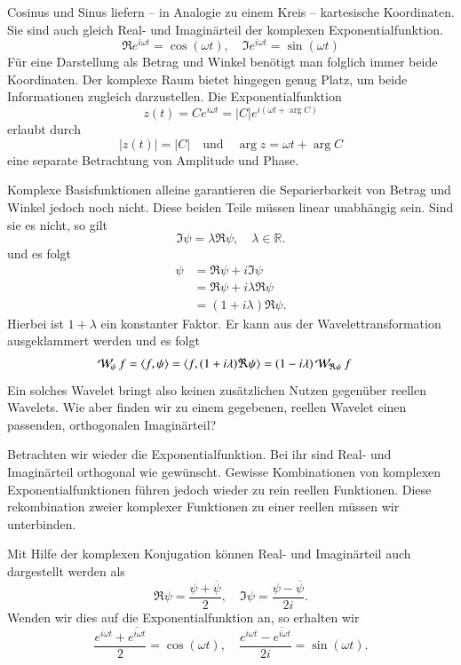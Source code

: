 Cosinus und Sinus liefern -- in Analogie zu einem Kreis -- kartesische Koordinaten. 
Sie sind auch gleich Real- und Imaginärteil der komplexen Exponentialfunktion.
\[
\Re e^{i\omega t} = \cos(\omega t), \quad \Im e^{i\omega t} = \sin(\omega t)
\]
Für eine Darstellung als Betrag und Winkel benötigt man folglich immer beide Koordinaten.
Der komplexe Raum bietet hingegen genug Platz, um beide Informationen zugleich darzustellen.
Die Exponentialfunktion
\[
	z(t) = Ce^{i\omega t} = |C|e^{i(\omega t + \arg C)}
\]
erlaubt durch 
\[
	|z(t)| = |C| 
	\quad \text{und}\quad
	\arg z = \omega t + \arg C
\]
eine separate Betrachtung von Amplitude und Phase.


Komplexe Basisfunktionen alleine garantieren die Separierbarkeit von Betrag und Winkel jedoch noch nicht.
Diese beiden Teile müssen linear unabhängig sein.
Sind sie es nicht, so gilt
\[\Im \psi = \lambda \Re \psi, \quad \lambda \in \mathbb R.\]
und es folgt
\begin{align*}
	\psi &= \Re \psi + i \Im \psi\\
	&= \Re \psi + i\lambda \Re \psi\\
	&= (1+i\lambda) \Re \psi.
\end{align*}
Hierbei ist $1+\lambda$ ein konstanter Faktor. 
Er kann aus der Wavelettransformation ausgeklammert werden und es folgt
\begin{align*}
	\Wave_\psi f 
	= \langle f, \psi \rangle
	&= \langle f, (1+i\lambda) \Re \psi \rangle
	= (1-i\lambda) \Wave_{\Re\psi}f
\end{align*}
Ein solches Wavelet bringt also keinen zusätzlichen Nutzen gegenüber reellen Wavelets.
Wie aber finden wir zu einem gegebenen, reellen Wavelet einen passenden, orthogonalen Imaginärteil?

Betrachten wir wieder die Exponentialfunktion.
Bei ihr sind Real- und Imaginärteil orthogonal wie gewünscht.
Gewisse Kombinationen von komplexen Exponentialfunktionen führen jedoch wieder zu rein reellen Funktionen.
Diese rekombination zweier komplexer Funktionen zu einer reellen müssen wir unterbinden.

Mit Hilfe der komplexen Konjugation können Real- und Imaginärteil auch dargestellt werden als
\[
\Re \psi = \frac{\psi + \overline\psi}{2} 
,\quad
\Im \psi = \frac{\psi - \overline\psi}{2i}.
\]
Wenden wir dies auf die Exponentialfunktion an, so erhalten wir
\begin{equation}
	\frac{e^{i\omega t} + \overline{e^{i\omega t}}}{2} = \cos(\omega t)
	,\quad
	\frac{e^{i\omega t} - \overline{e^{i\omega t}}}{2i} = \sin(\omega t). \label{complex:euler}
\end{equation}


